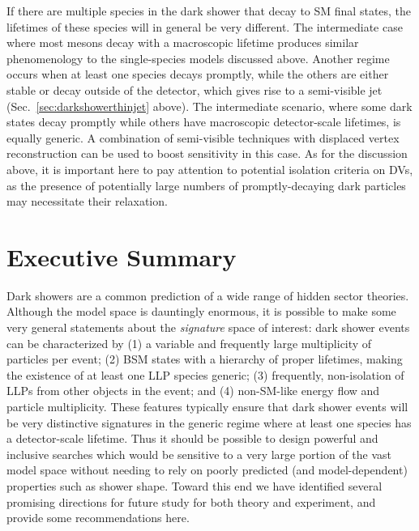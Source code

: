 If there are multiple species in the dark shower that decay to SM final states, the lifetimes of these species will in general be very different. The intermediate case where most mesons decay with a macroscopic lifetime produces similar phenomenology to the single-species models discussed above. Another regime occurs when at least one species decays promptly, while the others are either stable or decay outside of the detector, which gives rise to a semi-visible jet~\cite{Cohen:2015toa} (Sec.~\ref{sec:darkshowerthinjet} above).  The intermediate scenario, where some dark states decay promptly while others have macroscopic detector-scale lifetimes, is equally generic. A combination of semi-visible techniques with displaced vertex reconstruction can be used to boost sensitivity in this case.  As for the discussion above, it is important here to pay attention to potential isolation criteria on DVs, as the presence of potentially large numbers of promptly-decaying dark particles may necessitate their relaxation.

\section{Executive Summary}
\label{sec:darkshowersummary}

Dark showers are a common prediction of a wide range of hidden sector theories. %
Although the model space is dauntingly enormous, it is possible to make some very general statements about the {\em signature} space of interest: dark shower events can be characterized by (1)  a variable and frequently large multiplicity of particles per event; (2) BSM states with a hierarchy of proper lifetimes, making the existence of at least one LLP species generic; (3)  frequently, non-isolation of LLPs from other objects in the event; and (4) non-SM-like energy flow and particle multiplicity.   These features typically ensure that dark shower events will be very distinctive signatures in the generic regime where at least one species has a detector-scale lifetime.  Thus it should be possible to design powerful and inclusive searches which would be sensitive to a very large portion of the vast model space without needing to rely on poorly predicted (and model-dependent) properties such as shower shape.   Toward this end we have identified several promising directions for future study for both theory and experiment, and provide some recommendations here.

